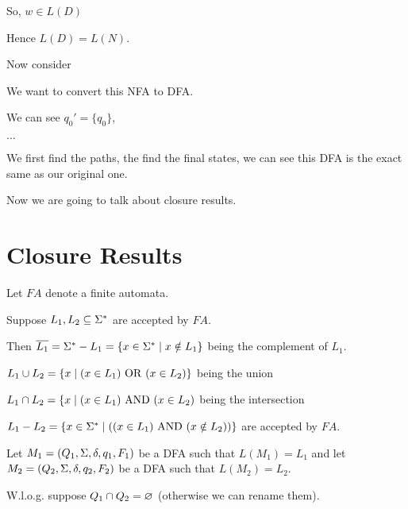 \documentclass[11pt, cyan, night, 0.5in]{hw}
\begin{document}
So, $w\in L(D)$ 


Hence $L(D)=L(N)$.

Now consider 

We want to convert this NFA to DFA.

We can see $q_0'=\{q_0\}$,

$\dots$


We first find the paths, the find the final states, we can see this DFA is the exact same as our original one.

Now we are going to talk about closure results.

\section{Closure Results}

Let $FA$ denote a finite automata.

Suppose $L_1,L_2\subseteq\Sigma^*$ are accepted by $FA$.

Then $\overline{L_1}=\Sigma^*-L_1=\{x\in\Sigma^*\mid x\notin L_1\}$ being the complement of $L_1$.

$L_1\cup L_2=\{x\mid (x\in L_1)\,\,\mathrm{OR}\,\, (x\in L_2)\}$ being the union

$L_1\cap L_2=\{x\mid (x\in L_1) \,\,\mathrm{AND}\,\, (x\in L_2)$ being the intersection

$L_1-L_2=\{x\in\Sigma^*\mid ((x\in L_1)\,\,\mathrm{AND}\,\, (x\notin L_2))\}$ are accepted by $FA$.


Let $M_1=(Q_1,\Sigma,\delta,q_1,F_1)$ be a DFA such that $L(M_1)=L_1$ and let $M_2=(Q_2,\Sigma,\delta,q_2,F_2)$ be a DFA such that $L(M_2)=L_2$.

W.l.o.g. suppose $Q_1\cap Q_2=\varnothing$ (otherwise we can rename them).
\end{document}
